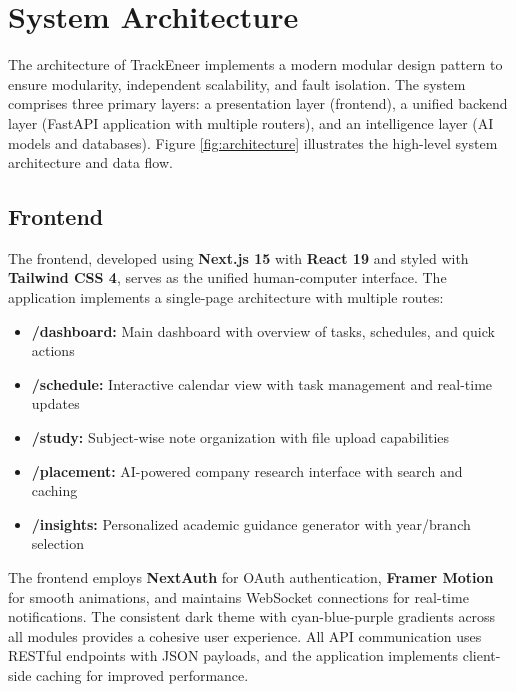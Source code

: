 \documentclass[conference]{IEEEtran}
\begin{document}
\section{System Architecture}
The architecture of TrackEneer implements a modern modular design pattern to ensure modularity, independent scalability, and fault isolation. The system comprises three primary layers: a presentation layer (frontend), a unified backend layer (FastAPI application with multiple routers), and an intelligence layer (AI models and databases). Figure \ref{fig:architecture} illustrates the high-level system architecture and data flow.

\subsection{Frontend}
The frontend, developed using \textbf{Next.js 15} with \textbf{React 19} and styled with \textbf{Tailwind CSS 4}, serves as the unified human-computer interface. The application implements a single-page architecture with multiple routes:
\begin{itemize}
    \item \textbf{/dashboard:} Main dashboard with overview of tasks, schedules, and quick actions
    \item \textbf{/schedule:} Interactive calendar view with task management and real-time updates
    \item \textbf{/study:} Subject-wise note organization with file upload capabilities
    \item \textbf{/placement:} AI-powered company research interface with search and caching
    \item \textbf{/insights:} Personalized academic guidance generator with year/branch selection
\end{itemize}

The frontend employs \textbf{NextAuth} for OAuth authentication, \textbf{Framer Motion} for smooth animations, and maintains WebSocket connections for real-time notifications. The consistent dark theme with cyan-blue-purple gradients across all modules provides a cohesive user experience. All API communication uses RESTful endpoints with JSON payloads, and the application implements client-side caching for improved performance.
\end{document}
